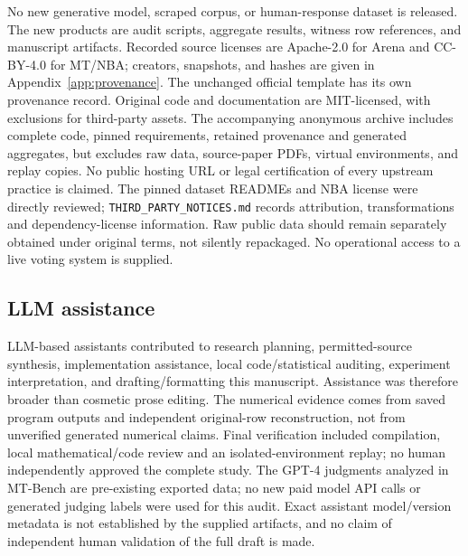 No new generative model, scraped corpus, or human-response dataset is released. The new products are audit scripts, aggregate results, witness row references, and manuscript artifacts. Recorded source licenses are Apache-2.0 for Arena and CC-BY-4.0 for MT/NBA; creators, snapshots, and hashes are given in Appendix~\ref{app:provenance}. The unchanged official template has its own provenance record. Original code and documentation are MIT-licensed, with exclusions for third-party assets. The accompanying anonymous archive includes complete code, pinned requirements, retained provenance and generated aggregates, but excludes raw data, source-paper PDFs, virtual environments, and replay copies. No public hosting URL or legal certification of every upstream practice is claimed. The pinned dataset READMEs and NBA license were directly reviewed; \texttt{THIRD\_PARTY\_NOTICES.md} records attribution, transformations and dependency-license information. Raw public data should remain separately obtained under original terms, not silently repackaged. No operational access to a live voting system is supplied.

\subsection{LLM assistance}
LLM-based assistants contributed to research planning, permitted-source synthesis, implementation assistance, local code/statistical auditing, experiment interpretation, and drafting/formatting this manuscript. Assistance was therefore broader than cosmetic prose editing. The numerical evidence comes from saved program outputs and independent original-row reconstruction, not from unverified generated numerical claims. Final verification included compilation, local mathematical/code review and an isolated-environment replay; no human independently approved the complete study. The GPT-4 judgments analyzed in MT-Bench are pre-existing exported data; no new paid model API calls or generated judging labels were used for this audit. Exact assistant model/version metadata is not established by the supplied artifacts, and no claim of independent human validation of the full draft is made.
